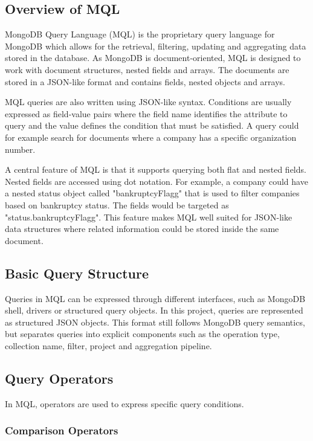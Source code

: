 \subsection{Overview of MQL}

MongoDB Query Language (MQL) is the proprietary query language for MongoDB which allows for the retrieval, filtering, updating and aggregating data stored in the database. As MongoDB is document-oriented, MQL is designed to work with document structures, nested fields and arrays. The documents are stored in a JSON-like format and contains fields, nested objects and arrays.

MQL queries are also written using JSON-like syntax. Conditions are usually expressed as field-value pairs where the field name identifies the attribute to query and the value defines the condition that must be satisfied. A query could for example search for documents where a company has a specific organization number.

A central feature of MQL is that it supports querying both flat and nested fields. Nested fields are accessed using dot notation. For example, a company could have a nested status object called "bankruptcyFlagg" that is used to filter companies based on bankruptcy status. The fields would be targeted as "status.bankruptcyFlagg". This feature makes MQL well suited for JSON-like data structures where related information could be stored inside the same document. 
    
\subsection{Basic Query Structure}

Queries in MQL can be expressed through different interfaces, such as MongoDB shell, drivers or structured query objects. In this project, queries are represented as structured JSON objects. This format still follows MongoDB query semantics, but separates queries into explicit components such as the operation type, collection name, filter, project and aggregation pipeline. 




\subsection{Query Operators}

In MQL, operators are used to express specific query conditions. 

\subsubsection{Comparison Operators}


